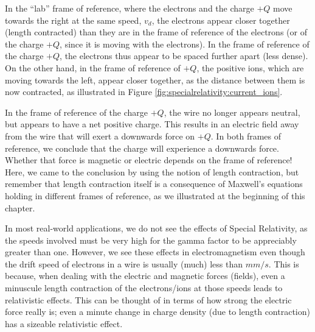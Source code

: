In the ``lab'' frame of reference, where the electrons and the charge $+Q$ move towards the right at the same speed, $v_d$, the electrons appear closer together (length contracted) than they are in the frame of reference of the electrons (or of the charge $+Q$, since it is moving with the electrons). In the frame of reference of the charge $+Q$, the electrons thus appear to be spaced further apart (less dense). On the other hand, in the frame of reference of $+Q$, the positive ions, which are moving towards the left, appear closer together, as the distance between them is now contracted, as illustrated in Figure \ref{fig:specialrelativity:current_ions}.

In the frame of reference of the charge $+Q$, the wire no longer appears neutral, but appears to have a net positive charge. This results in an electric field away from the wire that will exert a downwards force on $+Q$. In both frames of reference, we conclude that the charge will experience a downwards force. Whether that force is magnetic or electric depends on the frame of reference! Here, we came to the conclusion by using the notion of length contraction, but remember that length contraction itself is a consequence of Maxwell's equations holding in different frames of reference, as we illustrated at the beginning of this chapter. 

In most real-world applications, we do not see the effects of Special Relativity, as the speeds involved must be very high for the gamma factor to be appreciably greater than one. However, we see these effects in electromagnetism even though the drift speed of electrons in a wire is usually (much) less than $\si{mm/s}$. This is because, when dealing with the electric and magnetic forces (fields), even a minuscule length contraction of the electrons/ions at those speeds leads to relativistic effects. This can be thought of in terms of how strong the electric force really is; even a minute change in charge density (due to length contraction) has a sizeable relativistic effect.

